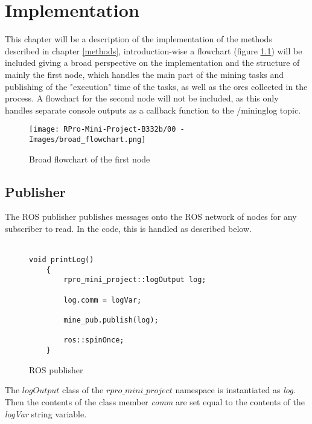 \chapter{Implementation}\label{implementation}

This chapter will be a description of the implementation of the methods described in chapter \ref{methods}, introduction-wise a flowchart (figure \ref{flowchart1}) will be included giving a broad perspective on the implementation and the structure of mainly the first node, which handles the main part of the mining tasks and publishing of the "execution" time of the tasks, as well as the ores collected in the process. A flowchart for the second node will not be included, as this only handles separate console outputs as a callback function to the /mininglog topic.

\begin{figure}[!ht]
  \centering
  \texttt{[image: RPro-Mini-Project-B332b/00 - Images/broad\_flowchart.png]}
  \caption{Broad flowchart of the first node}
  \label{flowchart1}
\end{figure}


\newpage

\section{Publisher}
The ROS publisher publishes messages onto the ROS network of nodes for any subscriber to read. In the code, this is handled as described below.\\
\\
\begin{figure}[!ht]
\begin{lstlisting}
void printLog()
    {
        rpro_mini_project::logOutput log;

        log.comm = logVar;

        mine_pub.publish(log);

        ros::spinOnce;
    }     
\end{lstlisting}
\vspace{-10mm}
\caption{ROS publisher}
\end{figure}

The $logOutput$ class of the $rpro\_mini\_project$ namespace is instantiated as \textit{log}. Then the contents of the class member \textit{comm} are set equal to the contents of the \textit{logVar} string variable.

